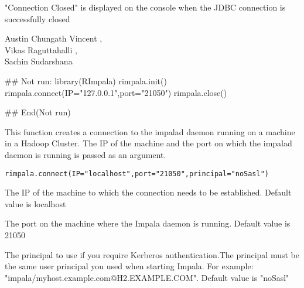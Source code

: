 \documentclass[letterpaper]{book}
\begin{document}
%
\begin{Value}
"Connection Closed" is displayed on the console when the JDBC connection is successfully closed
\end{Value}
%
\begin{Author}\relax
Austin Chungath Vincent ,\\{}
Vikas Raguttahalli ,\\{}
Sachin Sudarshana 
\end{Author}
%
\begin{Examples}
\begin{ExampleCode}
## Not run: 
library(RImpala)
rimpala.init()
rimpala.connect(IP="127.0.0.1",port="21050")
rimpala.close()

## End(Not run)
\end{ExampleCode}
\end{Examples}
%
\begin{Description}\relax
This function creates a connection to the impalad daemon running on a machine in a Hadoop Cluster. The IP of the machine and the port on which the impalad daemon is running is passed as an argument.
\end{Description}
%
\begin{Usage}
\begin{verbatim}
rimpala.connect(IP="localhost",port="21050",principal="noSasl")
\end{verbatim}
\end{Usage}
%
\begin{Arguments}
\begin{ldescription}
\item[\code{IP}] 
The IP of the machine to which the connection needs to be established. Default value is localhost

\item[\code{port}] 
The port on the machine where the Impala daemon is running. Default value is 21050

\item[\code{principal}] 
The principal to use if you require Kerberos authentication.The principal must be the same user principal you used when starting Impala. For example: "impala/myhost.example.com@H2.EXAMPLE.COM". Default value is "noSasl"

\end{ldescription}
\end{Arguments}
\end{document}
